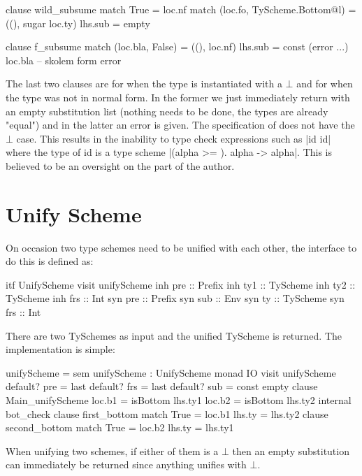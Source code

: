 \begin{code}
clause wild_subsume
  match True                        = loc.nf
  match (loc.fo, TyScheme.Bottom@l) = ((), sugar loc.ty)
  lhs.sub = empty
  
clause f_subsume
  match (loc.bla, False) = ((), loc.nf)
  lhs.sub = const (error ...) loc.bla -- skolem form error
\end{code}
The last two clauses are for when the type is instantiated with a $\bot$ and for when the type was not in normal form. In the former we just immediately return with an empty substitution list (nothing needs to be done, the types are already "equal") and in the latter an error is given. The specification of \cite{HML} does not have the $\bot$ case. This results in the inability to type check expressions such as |id id| where the type of id is a type scheme |(alpha >= \bot). alpha -> alpha|. This is believed to be an oversight on the part of the author.

\section{Unify Scheme} 
On occasion two type schemes need to be unified with each other, the interface to do this is defined as:

\begin{code}
itf UnifyScheme
  visit unifyScheme
    inh pre  :: Prefix
    inh ty1  :: TyScheme
    inh ty2  :: TyScheme
    inh frs  :: Int
    syn pre  :: Prefix
    syn sub  :: Env
    syn ty   :: TyScheme
    syn frs  :: Int 
\end{code}

There are two TySchemes as input and the unified TyScheme is returned. The implementation is simple:

\begin{code}
unifyScheme = sem unifyScheme : UnifyScheme monad IO
                visit unifyScheme
                  default? pre = last
                  default? frs = last
                  default? sub = const empty
                  clause Main_unifyScheme
                      loc.b1  = isBottom lhs.ty1
                      loc.b2  = isBottom lhs.ty2
                      internal bot_check
                        clause first_bottom
                            match True  = loc.b1
                            lhs.ty      = lhs.ty2
                        clause second_bottom
                            match True  = loc.b2
                            lhs.ty      = lhs.ty1
\end{code}
When unifying two schemes, if either of them is a $\bot$ then an empty substitution can immediately be returned since anything unifies with $\bot$. 

